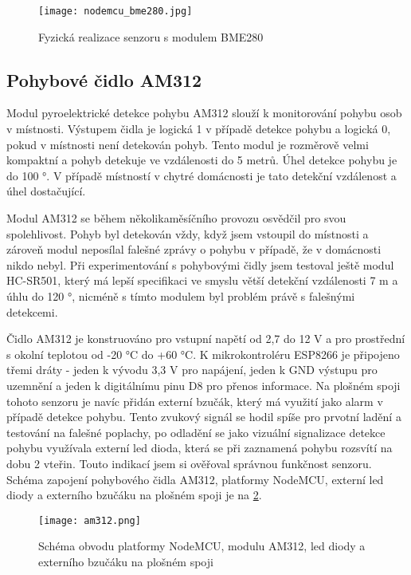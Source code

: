 \begin{figure}[H]
  \centering
  \texttt{[image: nodemcu\_bme280.jpg]}
  \caption{Fyzická realizace senzoru s modulem BME280}
  \label{fig:nodemcu_bme280}
\end{figure} 

\subsection{Pohybové čidlo AM312}

Modul pyroelektrické detekce pohybu AM312 slouží k monitorování pohybu osob v místnosti. Výstupem čidla je logická 1 v případě detekce pohybu a logická 0, pokud v místnosti není detekován pohyb. Tento modul je rozměrově velmi kompaktní a pohyb detekuje ve vzdálenosti do 5 metrů. Úhel detekce pohybu je do 100 \si{\degree}. V případě místností v chytré domácnosti je tato detekční vzdálenost a úhel dostačující. \par 
Modul AM312 se během několikaměsíčního provozu osvědčil pro svou spolehlivost. Pohyb byl detekován vždy, když jsem vstoupil do místnosti a zároveň modul neposílal falešné zprávy o pohybu v případě, že v domácnosti nikdo nebyl. Při experimentování s pohybovými čidly jsem testoval ještě modul HC-SR501, který má lepší specifikaci ve smyslu větší detekční vzdálenosti 7 m a úhlu do 120 \si{\degree}, nicméně s tímto modulem byl problém právě s falešnými detekcemi. \par
Čidlo AM312 je konstruováno pro vstupní napětí od 2,7 do 12 V a pro prostřední s okolní teplotou od -20 \si{\degree}C do +60 \si{\degree}C. K mikrokontroléru ESP8266 je připojeno třemi dráty - jeden k vývodu 3,3 V pro napájení, jeden k GND výstupu pro uzemnění a jeden k digitálnímu pinu D8 pro přenos informace. Na plošném spoji tohoto senzoru je navíc přidán externí bzučák, který má využití jako alarm v případě detekce pohybu. Tento zvukový signál se hodil spíše pro prvotní ladění a testování na falešné poplachy, po odladění se jako vizuální signalizace detekce pohybu využívala externí led dioda, která se při zaznamená pohybu rozsvítí na dobu 2 vteřin. Touto indikací jsem si ověřoval správnou funkčnost senzoru. Schéma zapojení pohybového čidla AM312, platformy NodeMCU, externí led diody a externího bzučáku na plošném spoji je na \cref{fig:schema_esp_am312}. 

\begin{figure}[H]
  \centering
  \texttt{[image: am312.png]}
  \caption{Schéma obvodu platformy NodeMCU, modulu AM312, led diody a externího bzučáku na plošném spoji}
  \label{fig:schema_esp_am312}
\end{figure}


